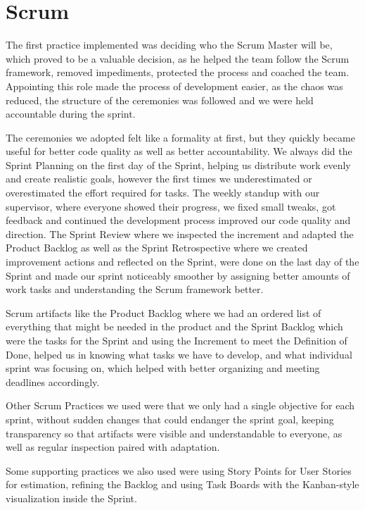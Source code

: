 \section{Scrum}

The first practice implemented was deciding who the Scrum Master will be, which proved to be a valuable decision, as he helped the team follow the Scrum framework, removed impediments, protected the process and coached the team. Appointing this role made the process of development easier, as the chaos was reduced, the structure of the ceremonies was followed and we were held accountable during the sprint. 

The ceremonies we adopted felt like a formality at first, but they quickly became useful for better code quality as well as better accountability. We always did the Sprint Planning on the first day of the Sprint, helping us distribute work evenly and create realistic goals, however the first times we underestimated or overestimated the effort required for tasks. The weekly standup with our supervisor, where everyone showed their progress, we fixed small tweaks, got feedback and continued the development process improved our code quality and direction. The Sprint Review where we inspected the increment and adapted the Product Backlog as well as the Sprint Retrospective where we created improvement actions and reflected on the Sprint, were done on the last day of the Sprint and made our sprint noticeably smoother by assigning better amounts of work tasks  and understanding the Scrum framework better.

Scrum artifacts like the Product Backlog where we had an ordered list of everything that might be needed in the product and the Sprint Backlog which were the tasks for the Sprint and using the Increment to meet the Definition of Done, helped us in knowing what tasks we have to develop, and what individual sprint was focusing on, which helped with better organizing and meeting deadlines accordingly.  

Other Scrum Practices we used were that we only had a single objective for each sprint, without sudden changes that could endanger the sprint goal, keeping transparency so that artifacts were visible and understandable to everyone, as well as regular inspection paired with adaptation. 

Some supporting practices we also used were using Story Points for User Stories for estimation, refining the Backlog and using Task Boards with the Kanban-style visualization inside the Sprint.

